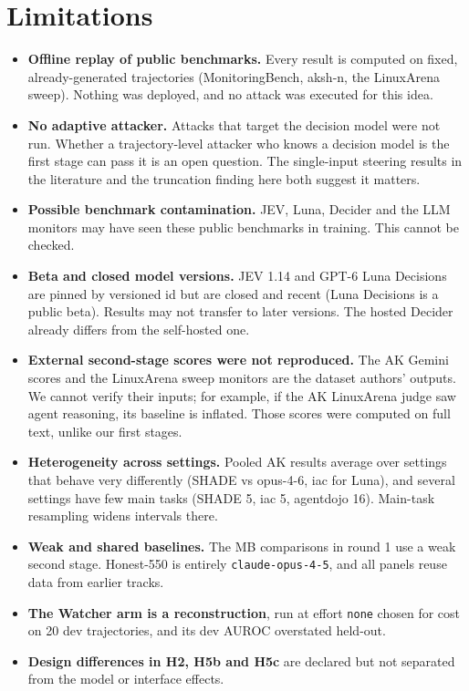\documentclass[11pt]{article}
\begin{document}
\section{Limitations}\label{sec:lim}
\begin{itemize}
\item \textbf{Offline replay of public benchmarks.} Every result is computed on fixed, already-generated trajectories (MonitoringBench, aksh-n, the LinuxArena sweep). Nothing was deployed, and no attack was executed for this idea.
\item \textbf{No adaptive attacker.} Attacks that target the decision model were not run. Whether a trajectory-level attacker who knows a decision model is the first stage can pass it is an open question. The single-input steering results in the literature and the truncation finding here both suggest it matters.
\item \textbf{Possible benchmark contamination.} JEV, Luna, Decider and the LLM monitors may have seen these public benchmarks in training. This cannot be checked.
\item \textbf{Beta and closed model versions.} JEV 1.14 and GPT-6 Luna Decisions are pinned by versioned id but are closed and recent (Luna Decisions is a public beta). Results may not transfer to later versions. The hosted Decider already differs from the self-hosted one.
\item \textbf{External second-stage scores were not reproduced.} The AK Gemini scores and the LinuxArena sweep monitors are the dataset authors' outputs. We cannot verify their inputs; for example, if the AK LinuxArena judge saw agent reasoning, its baseline is inflated. Those scores were computed on full text, unlike our first stages.
\item \textbf{Heterogeneity across settings.} Pooled AK results average over settings that behave very differently (SHADE vs opus-4-6, iac for Luna), and several settings have few main tasks (SHADE 5, iac 5, agentdojo 16). Main-task resampling widens intervals there.
\item \textbf{Weak and shared baselines.} The MB comparisons in round 1 use a weak second stage. Honest-550 is entirely \texttt{claude-opus-4-5}, and all panels reuse data from earlier tracks.
\item \textbf{The Watcher arm is a reconstruction}, run at effort \texttt{none} chosen for cost on 20 dev trajectories, and its dev AUROC overstated held-out.
\item \textbf{Design differences in H2, H5b and H5c} are declared but not separated from the model or interface effects.
\end{itemize}
\end{document}
